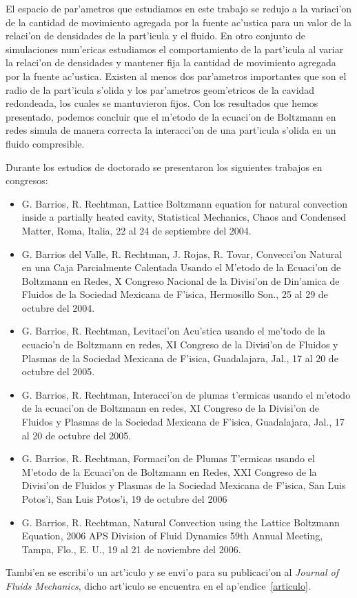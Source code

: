 El espacio de par'ametros que estudiamos en este trabajo se redujo a la variaci'on
de la cantidad de movimiento agregada por la fuente ac'ustica para un valor de la relaci'on
de densidades de la part'icula y el fluido. En otro conjunto de simulaciones num'ericas
estudiamos el comportamiento de la part'icula al variar la relaci'on de densidades y mantener
fija la cantidad de movimiento agregada por la fuente ac'ustica. Existen al menos dos par'ametros
importantes que son el radio de la part'icula s'olida y los par'ametros geom'etricos de la cavidad
redondeada, los cuales se mantuvieron fijos. Con los resultados que hemos presentado, podemos concluir
que el m'etodo de la ecuaci'on de Boltzmann en redes simula de manera correcta
la interacci'on de una part'icula s'olida en un fluido compresible.

Durante los estudios de doctorado se presentaron los siguientes trabajos en congresos:
\begin{itemize}
\item  	G. Barrios, R. Rechtman, Lattice Boltzmann equation for natural 
	convection inside a partially heated cavity, Statistical Mechanics, 
	Chaos and Condensed Matter, Roma, Italia, 22 al 24 de septiembre del 2004.

\item  	G. Barrios del Valle, R. Rechtman, J. Rojas, R. Tovar, Convecci'on 
	Natural en una Caja Parcialmente Calentada Usando el M'etodo de 
	la Ecuaci'on de Boltzmann en Redes, X Congreso Nacional 
	de la Divisi'on de Din'amica de Fluidos de la Sociedad Mexicana de
	F'isica, Hermosillo Son., 25 al 29 de octubre del 2004.

\item  G. Barrios, R. Rechtman, Levitaci'on Acu'stica usando el me'todo 
	de la ecuacio'n de Boltzmann en redes, XI Congreso de la Divisi'on 
	de Fluidos y Plasmas de la Sociedad Mexicana de F'isica, 
	Guadalajara, Jal., 17 al 20 de octubre del 2005.
\item  G. Barrios, R. Rechtman, Interacci'on de plumas t'ermicas 
	usando el m'etodo de la ecuaci'on de Boltzmann en redes, 
	XI Congreso de la Divisi'on de Fluidos y Plasmas de la Sociedad 
	Mexicana de F'isica, Guadalajara, Jal., 17 al 20 de octubre del 2005.
\item   G. Barrios, R. Rechtman, Formaci'on de Plumas T'ermicas 
	usando el M'etodo de la Ecuaci'on de Boltzmann en Redes, 
	XXI Congreso de la Divisi'on de Fluidos y  Plasmas 
	de la Sociedad Mexicana de F'isica, San Luis Potos'i,
	San Luis Potos'i, 19 de octubre del 2006

\item 	G. Barrios, R. Rechtman, Natural Convection using the Lattice Boltzmann
	Equation, 2006 APS Division of Fluid Dynamics 59th Annual Meeting, Tampa,
	Flo., E. U., 19 al 21 de noviembre del 2006.
\end{itemize}

Tambi'en se escribi'o un art'iculo y se envi'o para su publicaci'on al 
{\it Journal of Fluids Mechanics}, dicho art'iculo se encuentra
en el ap'endice~\ref{articulo}.

